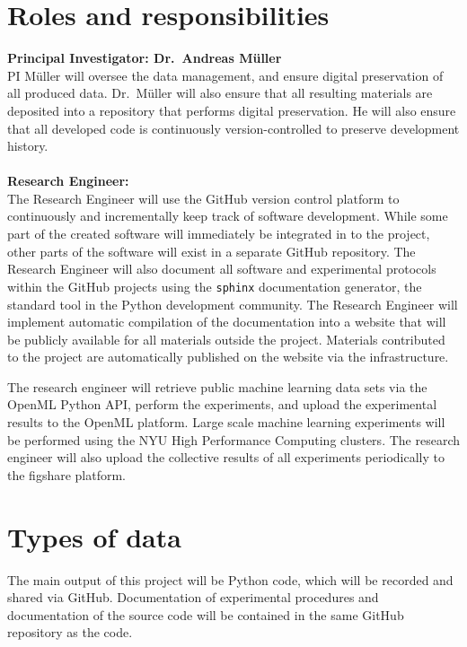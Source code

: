 \section{Roles and responsibilities}

\textbf{Principal Investigator: Dr.\ Andreas M\"uller}\\
PI M\"uller will oversee the data management, and ensure digital preservation of
all produced data. Dr.\ M\"uller will also ensure that all resulting materials
are deposited into a repository that performs digital preservation.
He will also ensure that all developed code is continuously version-controlled to
preserve development history.
\\\\
\textbf{Research Engineer:}\\
The Research Engineer will use the GitHub version control platform to
continuously and incrementally keep track of software development. While some
part of the created software will immediately be integrated in to the
\sklearn{} project, other parts of the software will exist in a separate
GitHub repository. The Research Engineer will also document all software and
experimental protocols within the GitHub projects using the \texttt{sphinx}
documentation generator, the standard tool in the Python development community.
The Research Engineer will implement automatic compilation of the documentation
into a website that will be publicly available for all materials outside the \sklearn{}
project. Materials contributed to the \sklearn{} project are automatically
published on the \sklearn{} website via the \sklearn{} infrastructure.

The research engineer will retrieve public machine learning data sets via the
OpenML Python API, perform the experiments, and upload the experimental results
to the OpenML platform. Large scale machine learning experiments will be
performed using the NYU High
Performance Computing clusters. The research engineer will also upload the
collective results of all experiments periodically to the figshare platform.

\section{Types of data}

The main output of this project will be Python code, which will be recorded and
shared via GitHub. Documentation of experimental procedures and documentation of the
source code will be contained in the same GitHub repository as the code.

